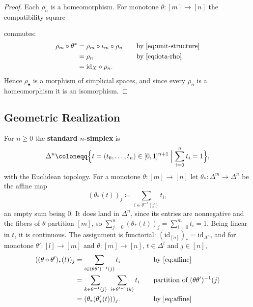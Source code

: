 \documentclass{extracta-temp-26}
\makeatletter
\numberwithin{equation}{section}
\theoremstyle{definition}
\theoremstyle{remark}
\newcommand{\G}{\mathcal{G}}
\newcommand{\id}{\mathrm{id}}
\newcommand{\term}[1]{\textbf{#1}}
\newcommand{\keepwithnext}{\leavevmode\par\nobreak\@afterheading}
\newcommand{\subhead}[1]{\subsection*{#1}\keepwithnext}
\makeatother
\begin{document}
\begin{proof}
Each \(\rho_n\) is a homeomorphism.
For monotone \(\theta\colon[m]\to[n]\) the compatibility square
\begin{center}
\end{center}
commutes:
\begin{equation}\label{eq:iso-square}
\begin{aligned}
\rho_m\circ\theta^*
&=\rho_m\circ\iota_m\circ\rho_n&&\quad\text{by \eqref{eq:unit-structure}}\\
&=\rho_n&&\quad\text{by \eqref{eq:iota-rho}}\\
&=\id_X\circ\rho_n.
\end{aligned}
\end{equation}
Hence \(\rho_\bullet\) is a morphism of simplicial spaces, and since every \(\rho_n\) is a homeomorphism it is an isomorphism.
\end{proof}

\subhead{Geometric Realization}
For \(n\ge 0\) the \term{standard \(n\)-simplex} is
\begin{equation}\label{eq:simplex}
\Delta^n\coloneqq\Bigl\{t=(t_0,\dots,t_n)\in[0,1]^{n+1}\Bigm|\sum_{i=0}^n t_i=1\Bigr\},
\end{equation}
with the Euclidean topology.
For a monotone \(\theta\colon[m]\to[n]\) let \(\theta_*\colon\Delta^m\to\Delta^n\) be the affine map
\begin{equation}\label{eq:affine}
(\theta_*(t))_j\coloneqq\sum_{i\in\theta^{-1}(j)}t_i,
\end{equation}
an empty sum being \(0\).
It does land in \(\Delta^n\), since its entries are nonnegative and the fibers of \(\theta\) partition \([m]\), so \(\sum_{j=0}^n(\theta_*(t))_j=\sum_{i=0}^m t_i=1\).
Being linear in \(t\), it is continuous.
The assignment is functorial: \((\id_{[n]})_*=\id_{\Delta^n}\), and for monotone \(\theta'\colon[l]\to[m]\) and \(\theta\colon[m]\to[n]\), \(t\in\Delta^l\) and \(j\in[n]\),
\begin{equation}\label{eq:affine-functorial}
\begin{aligned}
((\theta\circ\theta')_*(t))_j
&=\sum_{i\in(\theta\theta')^{-1}(j)}t_i&&\quad\text{by \eqref{eq:affine}}\\
&=\sum_{k\in\theta^{-1}(j)}\ \sum_{i\in\theta'^{-1}(k)}t_i&&\quad\text{partition of \((\theta\theta')^{-1}(j)\)}\\
&=(\theta_*(\theta'_*(t)))_j.&&\quad\text{by \eqref{eq:affine}}
\end{aligned}
\end{equation}
\end{document}
